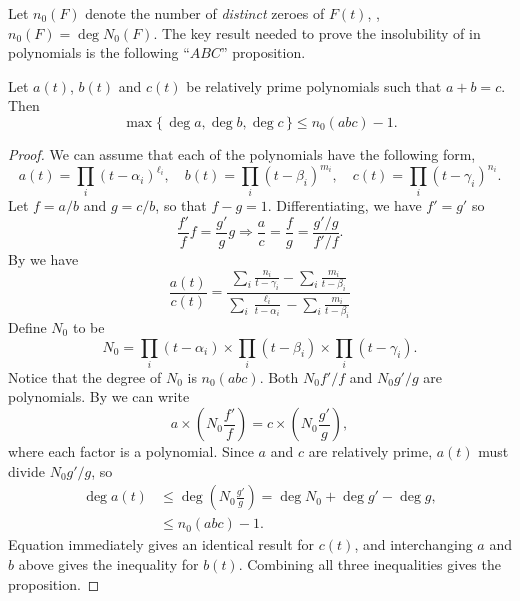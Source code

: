 Let $n_0(F)$ denote the number of {\em distinct} zeroes of $F(t)$,
\ie, $n_0(F) = \deg N_0(F)$.  The key result needed to prove the
insolubility of  in polynomials is the following
``$ABC$'' proposition.

\begin{proposition}[Mason]\label{Mason:ABC:Prop}
Let $a(t)$, $b(t)$ and $c(t)$ be relatively prime polynomials such
that $a+b=c$.  Then
\[
\max \{ \, \deg a, \deg b, \deg c \, \}
  \le n_0(abc) - 1.
\]
\end{proposition}

\begin{proof}
We can assume that each of the polynomials have the following form,
\[
a(t) = \prod_i (t - \alpha_i)^{\ell_i}, \quad b(t) = \prod_i (t -
\beta_i)^{m_i}, \quad c(t) = \prod_i (t - \gamma_i)^{n_i}.
\]
Let $f=a/b$ and $g = c/b$, so that $f - g = 1$.  Differentiating, we
have $f' = g'$ so
\[
\frac{f'}{f} f = \frac{g'}{g} g  \Longrightarrow
\frac{a}{c} = \frac{f}{g} = \frac{g'/g}{f'/f}.
\]
By  we have
\begin{equation}\label{Mason:Ratio:Eq}
\frac{a(t)}{c(t)} = 
\frac{\displaystyle\sum_i \frac{n_i}{t - \gamma_i} - \sum_i \frac{m_i}{t - \beta_i}}%
{\displaystyle\sum_i \frac{\ell_i}{t - \alpha_i} - \sum_i \frac{m_i}{t
- \beta_i}}
\end{equation}
Define $N_0$ to be
\[
N_0 = \prod_i(t - \alpha_i) \times
\prod_i(t - \beta_i) \times \prod_i(t - \gamma_i).
\]
Notice that the degree of $N_0$ is $n_0(abc)$.  Both $N_0 f'/f$ and
$N_0 g'/g$ are polynomials.  By  we can write
\begin{equation}\label{Mason:Help:a:Eq}
a \times \left(N_0 \frac{f'}{f}\right) = c \times \left(N_0
\frac{g'}{g}\right),
\end{equation}
where each factor is a polynomial.  Since $a$ and $c$ are relatively
prime, $a(t)$ must divide $N_0 g'/g$, so
\[
\begin {aligned}
\deg a(t) & \le \deg \left(N_0 \frac{g'}{g}\right) 
                = \deg N_0 + \deg g' - \deg g, \\ & \le n_0(abc) - 1.
\end{aligned}
\]
Equation  immediately gives an identical result
for $c(t)$, and interchanging $a$ and $b$ above gives the inequality
for $b(t)$.  Combining all three inequalities gives the proposition.
\end{proof}

